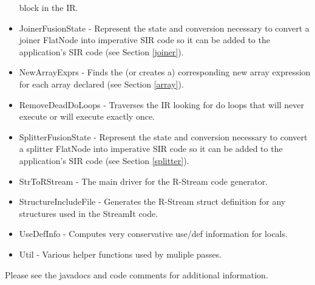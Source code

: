 \documentclass[10pt, letterpaper, onecolumn]{article}
\begin{document}
\begin{itemize}
block in the IR.
\item JoinerFusionState - Represent the state and conversion necessary
to convert a joiner FlatNode into imperative SIR code so it can be
added to the application's SIR code (see Section \ref{joiner}).
\item NewArrayExprs - Finds the (or creates a) corresponding new array
expression for each array declared (see Section \ref{array}).
\item RemoveDeadDoLoops - Traverses the IR looking for do loops that
will never execute or will execute exactly once.
\item SplitterFusionState - Represent the state and conversion
necessary to convert a splitter FlatNode into imperative SIR code so
it can be added to the application's SIR code (see Section \ref{splitter}).
\item StrToRStream - The main driver for the R-Stream code generator.
\item StructureIncludeFile - Generates the R-Stream struct definition for any
structures used in the StreamIt code.
\item UseDefInfo - Computes very conservative use/def information for
  locals.
\item Util - Various helper functions used by muliple passes.
\end{itemize}

Please see the javadocs and code comments for additional information.
\end{document}
